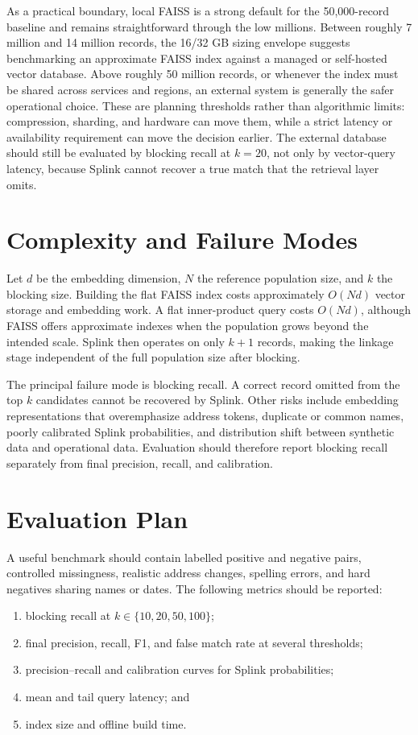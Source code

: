 \documentclass[conference]{IEEEtran}
\begin{document}
As a practical boundary, local FAISS is a strong default for the 50,000-record baseline and remains straightforward through the low millions. Between roughly 7 million and 14 million records, the 16/32 GB sizing envelope suggests benchmarking an approximate FAISS index against a managed or self-hosted vector database. Above roughly 50 million records, or whenever the index must be shared across services and regions, an external system is generally the safer operational choice. These are planning thresholds rather than algorithmic limits: compression, sharding, and hardware can move them, while a strict latency or availability requirement can move the decision earlier. The external database should still be evaluated by blocking recall at $k=20$, not only by vector-query latency, because Splink cannot recover a true match that the retrieval layer omits.

\section{Complexity and Failure Modes}
Let $d$ be the embedding dimension, $N$ the reference population size, and $k$ the blocking size. Building the flat FAISS index costs approximately $O(Nd)$ vector storage and embedding work. A flat inner-product query costs $O(Nd)$, although FAISS offers approximate indexes when the population grows beyond the intended scale. Splink then operates on only $k+1$ records, making the linkage stage independent of the full population size after blocking.

The principal failure mode is blocking recall. A correct record omitted from the top $k$ candidates cannot be recovered by Splink. Other risks include embedding representations that overemphasize address tokens, duplicate or common names, poorly calibrated Splink probabilities, and distribution shift between synthetic data and operational data. Evaluation should therefore report blocking recall separately from final precision, recall, and calibration.

\section{Evaluation Plan}
A useful benchmark should contain labelled positive and negative pairs, controlled missingness, realistic address changes, spelling errors, and hard negatives sharing names or dates. The following metrics should be reported:
\begin{enumerate}[leftmargin=*]
  \item blocking recall at $k \in \{10,20,50,100\}$;
  \item final precision, recall, F1, and false match rate at several thresholds;
  \item precision--recall and calibration curves for Splink probabilities;
  \item mean and tail query latency; and
  \item index size and offline build time.
\end{enumerate}
\end{document}

